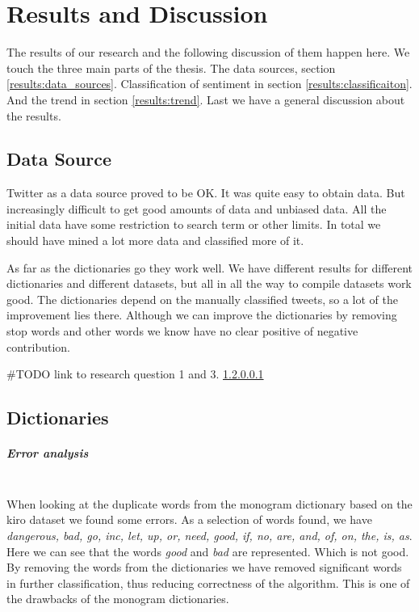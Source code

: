 \chapter{Results and Discussion}\label{results}

The results of our research and the following discussion of them happen here.
We touch the three main parts of the thesis. The data sources, section
\ref{results:data_sources}. Classification of sentiment in section
\ref{results:classificaiton}. And the trend in section \ref{results:trend}.
Last we have a general discussion about the results. 
%

\section{Data Source}
Twitter as a data source proved to be OK. It was quite easy to obtain data. But
increasingly difficult to get good amounts of data and unbiased data. All the
initial data have some restriction to search term or other limits. In total we
should have mined a lot more data and classified more of it. 

As far as the dictionaries go they work well. We have different results for
different dictionaries and different datasets, but all in all the way to
compile datasets work good. The dictionaries depend on the manually classified
tweets, so a lot of the improvement lies there. Although we can improve the
dictionaries by removing stop words and other words we know have no clear
positive of negative contribution. 

#TODO link to research question 1 and 3. \ref{}
%

\section{Dictionaries}

\paragraph{Error analysis}
\hspace{0pt}\\
When looking at the duplicate words from the monogram dictionary based on the
kiro dataset we found some errors.
As a selection of words found, we have \textit{dangerous, bad, go, inc, let, up,
or, need, good, if, no, are, and, of, on, the,
is, as}.
Here we can see that the words \textit{good} and \textit{bad} are represented.
Which is not good. By removing the words from the dictionaries we have removed
significant words in further classification, thus reducing correctness of the
algorithm. This is one of the drawbacks of the monogram dictionaries.

